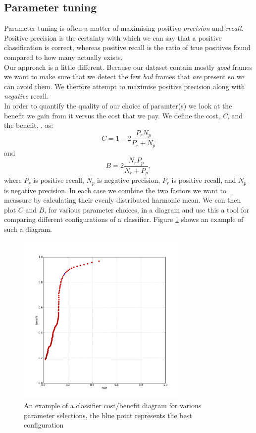 \subsection{Parameter tuning}\label{sec:ph1tweaking}
%
Parameter tuning is often a matter of maximising positive \textit{precision} and \textit{recall}. Positive precision is the certainty with which we can say that a positive classification is correct, whereas positive recall is the ratio of true positives found compared to how many actually exists.\\
Our approach is a little different. Because our dataset contain mostly \textit{good} frames we want to make sure that we detect the few \textit{bad} frames that \textit{are} present so we can avoid them. We therfore attempt to maximise positive precision along with \textit{negative} recall.\\
In order to quantify the quality of our choice of paramter(s) we look at the benefit we gain from it versus the cost that we pay. We define the cost, \textit{C}, and the benefit, , as:
%
\[
C = 1 - 2\frac{P_{r}N_{p}}{P_{r} + N_{p}}
\]
%
and
%
\[
B = 2\frac{N_{r} P_{p}}{N_{r} + P_{p}},
\]
%
where $P_r$ is positive recall, $N_p$ is negative precision, $P_r$ is positive recall, and $N_p$ is negative precision. In each case we combine the two factors we want to meassure by calculating their evenly distributed harmonic mean. We can then plot $C$ and $B$, for various parameter choices, in a diagram and use this a tool for comparing different configurations of a classifier. Figure \ref{fig:costbenefitdiagram} shows an example of such a diagram.
%
\begin{figure}
     \centering
     \includegraphics[width=0.75\textwidth]{img/2dcostbenefitexample2.jpg}
     \caption{An example of a classifier cost/benefit diagram for various parameter selections, the blue point represents the best configuration}
     \label{fig:costbenefitdiagram}
\end{figure}
